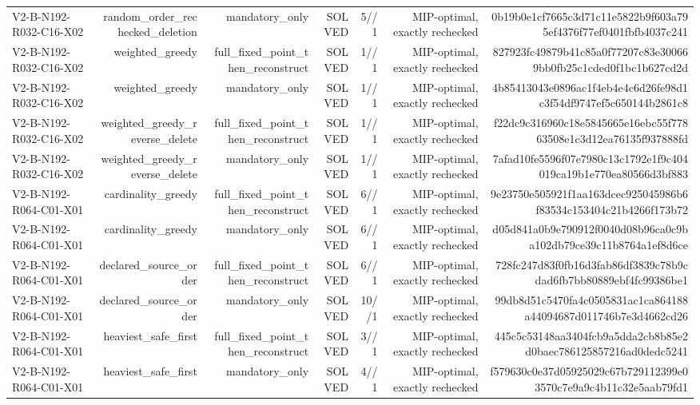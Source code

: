 {\begin{longtable}{lrrrrrr}
V2-B-N192-R032-C16-X02 & random\_order\_rechecked\_deletion & mandatory\_only & SOLVED & 5//1 & MIP-optimal, exactly rechecked & 0b19b0e1cf7665c3d71c11e5822b9f603a795ef4376f77ef0401fbfb4037c241 \\
V2-B-N192-R032-C16-X02 & weighted\_greedy & full\_fixed\_point\_then\_reconstruct & SOLVED & 1//1 & MIP-optimal, exactly rechecked & 827923fc49879b41c85a0f77207c83e300669bb0fb25c1cded0f1bc1b627cd2d \\
V2-B-N192-R032-C16-X02 & weighted\_greedy & mandatory\_only & SOLVED & 1//1 & MIP-optimal, exactly rechecked & 4b85413043e0896ac1f4eb4e4c6d26fe98d1c3f54df9747ef5c650144b2861c8 \\
V2-B-N192-R032-C16-X02 & weighted\_greedy\_reverse\_delete & full\_fixed\_point\_then\_reconstruct & SOLVED & 1//1 & MIP-optimal, exactly rechecked & f22dc9c316960c18e5845665e16ebc55f77863508e1c3d12ea76135f937888fd \\
V2-B-N192-R032-C16-X02 & weighted\_greedy\_reverse\_delete & mandatory\_only & SOLVED & 1//1 & MIP-optimal, exactly rechecked & 7afad10fe5596f07e7980c13c1792e1f9c404019ca19b1e770ea80566d3bf883 \\
V2-B-N192-R064-C01-X01 & cardinality\_greedy & full\_fixed\_point\_then\_reconstruct & SOLVED & 6//1 & MIP-optimal, exactly rechecked & 9e23750e505921f1aa163dcec925045986b6f83534c153404c21b4266f173b72 \\
V2-B-N192-R064-C01-X01 & cardinality\_greedy & mandatory\_only & SOLVED & 6//1 & MIP-optimal, exactly rechecked & d05d841a0b9e790912f0040d08b96ca0c9ba102db79ce39c11b8764a1ef8d6ce \\
V2-B-N192-R064-C01-X01 & declared\_source\_order & full\_fixed\_point\_then\_reconstruct & SOLVED & 6//1 & MIP-optimal, exactly rechecked & 728fc247d83f0fb16d3fab86df3839c78b9cdad6fb7bb80889ebf4fc99386be1 \\
V2-B-N192-R064-C01-X01 & declared\_source\_order & mandatory\_only & SOLVED & 10//1 & MIP-optimal, exactly rechecked & 99db8d51c5470fa4c0505831ac1ca864188a44094687d011746b7e3d4662cd26 \\
V2-B-N192-R064-C01-X01 & heaviest\_safe\_first & full\_fixed\_point\_then\_reconstruct & SOLVED & 3//1 & MIP-optimal, exactly rechecked & 445c5c53148aa3404fcb9a5dda2cb8b85e2d0baec786125857216ad0dedc5241 \\
V2-B-N192-R064-C01-X01 & heaviest\_safe\_first & mandatory\_only & SOLVED & 4//1 & MIP-optimal, exactly rechecked & f579630c0e37d05925029c67b729112399e03570c7e9a9c4b11c32e5aab79fd1 \\

\end{longtable}}
